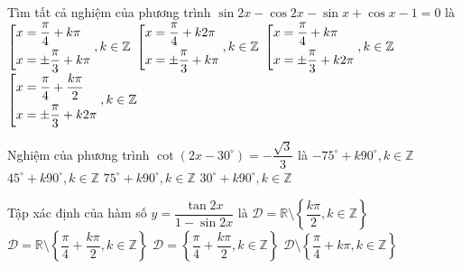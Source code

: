 \begin{ex}%
Tìm tất cả nghiệm của phương trình $\sin 2x-\cos 2x-\sin x+\cos x-1=0$ là
\choice
{$\left[\begin{aligned}&x=\dfrac{\pi}{4}+k\pi\\&x=\pm \dfrac{\pi}{3}+k\pi\end{aligned}\right.,k\in \mathbb{Z}$}
{$\left[\begin{aligned}&x=\dfrac{\pi}{4}+k2\pi\\&x=\pm \dfrac{\pi}{3}+k\pi\end{aligned}\right.,k\in \mathbb{Z}$}
{\True $\left[\begin{aligned}&x=\dfrac{\pi}{4}+k\pi\\&x=\pm \dfrac{\pi}{3}+k2\pi\end{aligned}\right.,k\in \mathbb{Z}$}
{$\left[\begin{aligned}&x=\dfrac{\pi}{4}+\dfrac{k\pi}{2}\\&x=\pm \dfrac{\pi}{3}+k2\pi\end{aligned}\right.,k\in \mathbb{Z}$}
\end{ex}

\begin{ex}%
Nghiệm của phương trình $\cot (2x-30^\circ)= -\dfrac{\sqrt{3}}{3}$ là
\choice
{$-75^\circ + k 90^\circ, k\in \mathbb{Z}$}
{$45^\circ + k 90^\circ, k\in \mathbb{Z}$}
{\True $75^\circ + k 90^\circ, k\in \mathbb{Z}$}
{$30^\circ + k 90^\circ, k\in \mathbb{Z}$}
\end{ex}

\begin{ex}%
Tập xác định của hàm số  $y=\dfrac{\tan 2x}{1-\sin 2x}$ là 
\choice
{$\mathscr{D} =\mathbb{R}\setminus \left \{\dfrac{k\pi}{2},k \in \mathbb{Z}\right \}$}
{\True $\mathscr{D}=\mathbb{R} \setminus \left \{\dfrac{\pi}{4}+\dfrac{k\pi}{2},k \in \mathbb{Z}\right \}$}
{$\mathscr{D} =\left \{\dfrac{\pi}{4}+\dfrac{k\pi}{2},k \in \mathbb{Z}\right \}$}
{$\mathscr{D} \setminus \left \{\dfrac{\pi}{4}+k\pi,k \in \mathbb{Z}\right \}$}
\end{ex}

